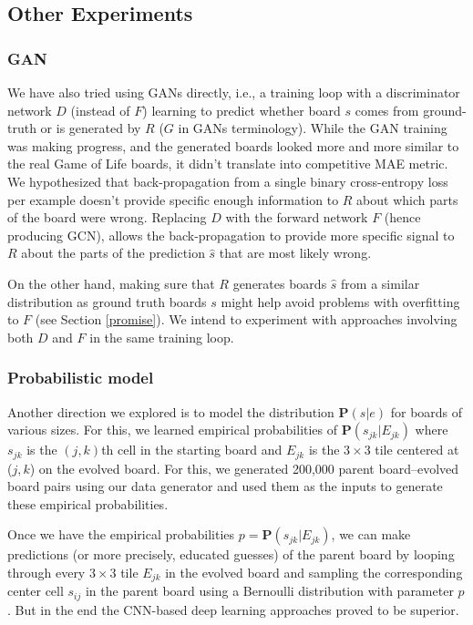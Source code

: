 \documentclass[conference]{IEEEtran}
\begin{document}
\subsection{Other Experiments}

\subsubsection{GAN}
We have also tried using GANs directly, i.e., a training loop with a discriminator network $D$ (instead of $F$) learning to predict whether board $s$ comes from ground-truth or is generated by $R$ ($G$ in GANs terminology). While the GAN training was making progress, and the generated boards looked more and more similar to the real Game of Life boards, it didn't translate into competitive MAE metric. We hypothesized that back-propagation from a single binary cross-entropy loss per example doesn't provide specific enough information to $R$ about which parts of the board were wrong. Replacing $D$ with the forward network $F$ (hence producing GCN), allows the back-propagation to provide more specific signal to $R$ about the parts of the prediction $\hat s$ that are most likely wrong.

On the other hand, making sure that $R$ generates boards $\hat s$ from a similar distribution as ground truth boards $s$ might help avoid problems with overfitting to $F$ (see Section \ref{promise}). We intend to experiment with approaches involving both $D$ and $F$ in the same training loop.

\subsubsection{Probabilistic model}
Another direction we explored is to model the distribution $\mathbf P(s | e)$ for boards of various sizes. For this, we learned empirical probabilities of $\mathbf P(s_{jk} | E_{jk})$ where $s_{jk}$ is the $(j, k)$th cell in the starting board and $E_{jk}$ is the $3 \times 3$ tile centered at ($j, k$) on the evolved board. For this, we generated 200,000 parent board--evolved board pairs using our data generator and used them as the inputs to generate these empirical probabilities. 

Once we have the empirical probabilities $p = \mathbf P(s_{jk} | E_{jk})$, we can make predictions (or more precisely, educated guesses) of the parent board by looping through every $3 \times 3$ tile $E_{jk}$ in the evolved board and sampling the corresponding center cell $s_{ij}$ in the parent board using a Bernoulli distribution with parameter $p$. But in the end the CNN-based deep learning approaches proved to be superior.
\end{document}
